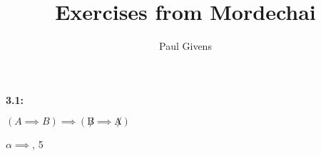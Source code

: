 \documentclass[letterpaper]{article}
\title{Exercises from Mordechai}
\author{Paul Givens}
\begin{document}
\maketitle

\textbf{3.1:}

\begin{minipage}[t]{0.5\textwidth}
$ (A \implies B) \implies (\not B \implies \not A) $
\end{minipage}

\begin{minipage}[t]{0.5\textwidth}
$\alpha \implies$, 5
\end{minipage}
\end{document}
